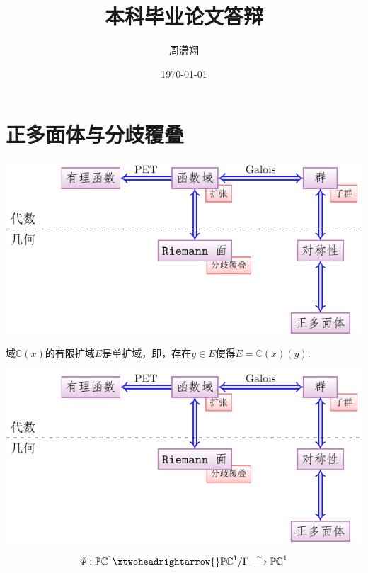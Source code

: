 \documentclass[pdf]{beamer}
\title{本科毕业论文答辩}
\author{周潇翔}
\institute[USTC]{University of Science and Technology of China}
\date{\today}
\numberwithin{equation}{section}
\theoremstyle{plain}
\theoremstyle{plain}
\theoremstyle{remark}
\begin{document}
	\begin{frame}
	\titlepage
	\end{frame}
\section{正多面体与分歧覆叠}
	\begin{frame}
\includegraphics[]{Flowchart/flowchart1.pdf}
	\begin{minipage}[t]{.75\textwidth}
	\vspace{-2cm}
	\begin{theorem}
		域$\mathbb{C}(x)$的有限扩域$E$是单扩域，即，存在$y \in E$使得$E =\mathbb{C}(x)(y)$.
	\end{theorem}
	
\end{minipage}
\end{frame}
	\begin{frame}
\includegraphics[]{Flowchart/flowchart1.pdf}
\begin{minipage}[t]{.75\textwidth}
	\vspace{-1cm}
	$$\varPhi:\mathbb{PC}^1\xtwoheadrightarrow{}\mathbb{PC}^1/\Gamma\overset{\sim}{\longrightarrow}\mathbb{PC}^1$$
	
\end{minipage}

\end{frame}
\end{document}
